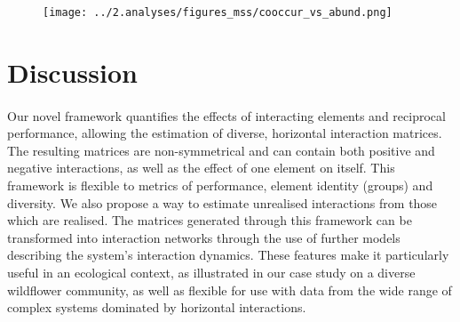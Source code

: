 \documentclass[a4,12pt]{article}
\begin{document}
    \begin{figure}[H]
        \begin{centering}
        \texttt{[image: ../2.analyses/figures\_mss/cooccur\_vs\_abund.png]}
        \caption{}
        \label{fig:coocab}
        \end{centering}
    \end{figure} 


\section{Discussion}
    



    \paragraph{} 
    Our novel framework quantifies the effects of interacting elements and reciprocal performance, allowing the estimation of diverse, horizontal interaction matrices. The resulting matrices are non-symmetrical and can contain both positive and negative interactions, as well as the effect of one element on itself. This framework is flexible to metrics of performance, element identity (groups) and diversity. We also propose a way to estimate unrealised interactions from those which are realised. The matrices generated through this framework can be transformed into interaction networks through the use of further models describing the system's interaction dynamics. These features make it particularly useful in an ecological context, as illustrated in our case study on a diverse wildflower community, as well as flexible for use with data from the wide range of complex systems dominated by horizontal interactions.
\end{document}
